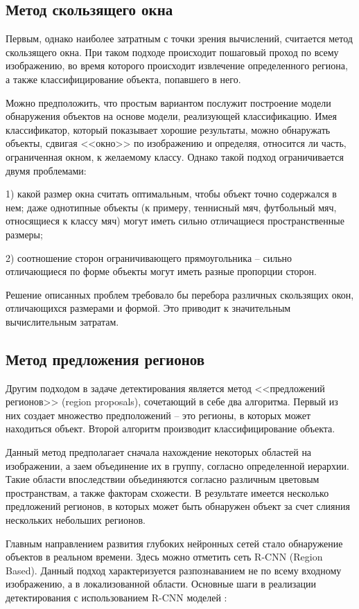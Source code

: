 \documentclass[14pt,a4paper]{extarticle}
\begin{document}
\subsection{Метод скользящего окна}
Первым, однако наиболее затратным с точки зрения вычислений, считается метод скользящего окна. При таком подходе происходит пошаговый проход по всему изображению, во время которого происходит извлечение определенного региона, а также классифицирование объекта, попавшего в него. 

Можно предположить, что простым вариантом послужит построение модели обнаружения объектов на основе модели, реализующей классификацию. Имея классификатор, который показывает хорошие результаты, можно обнаружать объекты, сдвигая <<окно>> по изображению и определяя, относится ли часть, ограниченная окном, к желаемому классу. Однако такой подход  ограничивается двумя проблемами:

1) какой размер окна считать оптимальным, чтобы объект точно содержался в нем; даже однотипные объекты (к примеру, теннисный мяч, футбольный мяч, относящиеся к классу мяч) могут иметь сильно отличащиеся пространственные размеры;

2) соотношение сторон ограничивающего прямоугольника -- сильно отличающиеся по форме объекты могут иметь разные пропорции сторон.

Решение описанных проблем требовало бы перебора различных скользящих окон, отличающихся размерами и формой. Это приводит к значительным вычислительным затратам.
 
\subsection{Метод предложения регионов}
Другим подходом в задаче детектирования является метод <<предложений регионов>> (region proposals), сочетающий в себе два алгоритма. Первый из них создает множество предположений -- это регионы, в которых может находиться объект. Второй алгоритм производит классифицирование объекта.  

Данный метод предполагает сначала нахождение некоторых областей на изображении, а заем объединение их в группу, согласно определенной иерархии. Такие области впоследствии объединяются согласно различным цветовым пространствам, а также факторам схожести. В результате имеется несколько предложений регионов, в которых может быть обнаружен объект за счет слияния нескольких небольших регионов.

Главным направлением развития глубоких нейронных сетей стало обнаружение объектов в реальном времени. Здесь можно отметить сеть R-CNN (Region Based). Данный подход характеризуется разпознаванием не по всему входному изображению, а в локализованной области. Основные шаги в реализации детектирования с использованием R-CNN моделей \cite{cnn}:
\end{document}
